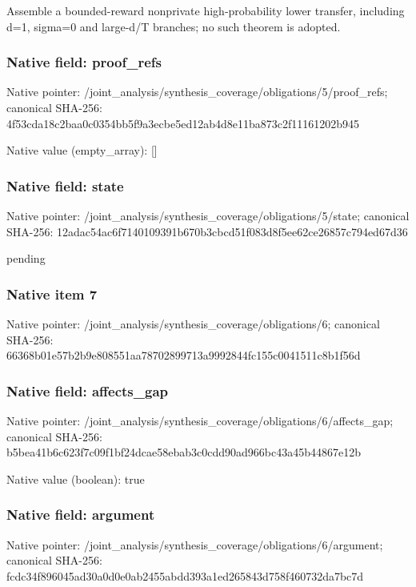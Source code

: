 \documentclass[10pt,a4paper]{article}
\begin{document}
\begingroup\raggedright\sloppy Assemble a bounded-reward nonprivate high-probability lower transfer,\allowbreak{} including d=\allowbreak{}1,\allowbreak{} sigma=\allowbreak{}0 and large-d/\allowbreak{}T branches;\allowbreak{} no such theorem is adopted.\par\endgroup

\subsubsection{Native field: proof\_\allowbreak{}refs}
Native pointer: /joint\_\allowbreak{}analysis/synthesis\_\allowbreak{}coverage/obligations/5/proof\_\allowbreak{}refs; canonical SHA-256: 4f53cda18c2baa0c0354bb5f9a3ecbe5ed12ab4d8e11ba873c2f11161202b945

Native value (empty\_\allowbreak{}array): []

\subsubsection{Native field: state}
Native pointer: /joint\_\allowbreak{}analysis/synthesis\_\allowbreak{}coverage/obligations/5/state; canonical SHA-256: 12adac54ac6f7140109391b670b3cbcd51f083d8f5ee62ce26857c794ed67d36

\begingroup\raggedright\sloppy pending\par\endgroup

\subsubsection{Native item 7}
Native pointer: /joint\_\allowbreak{}analysis/synthesis\_\allowbreak{}coverage/obligations/6; canonical SHA-256: 66368b01e57b2b9e808551aa78702899713a9992844fc155c0041511c8b1f56d

\subsubsection{Native field: affects\_\allowbreak{}gap}
Native pointer: /joint\_\allowbreak{}analysis/synthesis\_\allowbreak{}coverage/obligations/6/affects\_\allowbreak{}gap; canonical SHA-256: b5bea41b6c623f7c09f1bf24dcae58ebab3c0cdd90ad966bc43a45b44867e12b

Native value (boolean): true

\subsubsection{Native field: argument}
Native pointer: /joint\_\allowbreak{}analysis/synthesis\_\allowbreak{}coverage/obligations/6/argument; canonical SHA-256: fcdc34f896045ad30a0d0e0ab2455abdd393a1ed265843d758f460732da7bc7d
\end{document}
